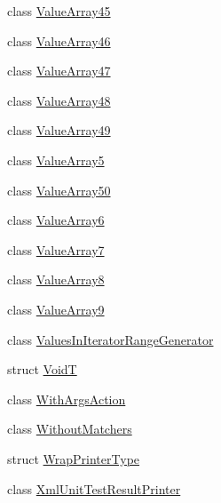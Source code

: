 \begin{DoxyCompactItemize}
class \mbox{\hyperlink{classtesting_1_1internal_1_1ValueArray45}{Value\+Array45}}
\item 
class \mbox{\hyperlink{classtesting_1_1internal_1_1ValueArray46}{Value\+Array46}}
\item 
class \mbox{\hyperlink{classtesting_1_1internal_1_1ValueArray47}{Value\+Array47}}
\item 
class \mbox{\hyperlink{classtesting_1_1internal_1_1ValueArray48}{Value\+Array48}}
\item 
class \mbox{\hyperlink{classtesting_1_1internal_1_1ValueArray49}{Value\+Array49}}
\item 
class \mbox{\hyperlink{classtesting_1_1internal_1_1ValueArray5}{Value\+Array5}}
\item 
class \mbox{\hyperlink{classtesting_1_1internal_1_1ValueArray50}{Value\+Array50}}
\item 
class \mbox{\hyperlink{classtesting_1_1internal_1_1ValueArray6}{Value\+Array6}}
\item 
class \mbox{\hyperlink{classtesting_1_1internal_1_1ValueArray7}{Value\+Array7}}
\item 
class \mbox{\hyperlink{classtesting_1_1internal_1_1ValueArray8}{Value\+Array8}}
\item 
class \mbox{\hyperlink{classtesting_1_1internal_1_1ValueArray9}{Value\+Array9}}
\item 
class \mbox{\hyperlink{classtesting_1_1internal_1_1ValuesInIteratorRangeGenerator}{Values\+In\+Iterator\+Range\+Generator}}
\item 
struct \mbox{\hyperlink{structtesting_1_1internal_1_1VoidT}{VoidT}}
\item 
class \mbox{\hyperlink{classtesting_1_1internal_1_1WithArgsAction}{With\+Args\+Action}}
\item 
class \mbox{\hyperlink{classtesting_1_1internal_1_1WithoutMatchers}{Without\+Matchers}}
\item 
struct \mbox{\hyperlink{structtesting_1_1internal_1_1WrapPrinterType}{Wrap\+Printer\+Type}}
\item 
class \mbox{\hyperlink{classtesting_1_1internal_1_1XmlUnitTestResultPrinter}{Xml\+Unit\+Test\+Result\+Printer}}
\end{DoxyCompactItemize}
